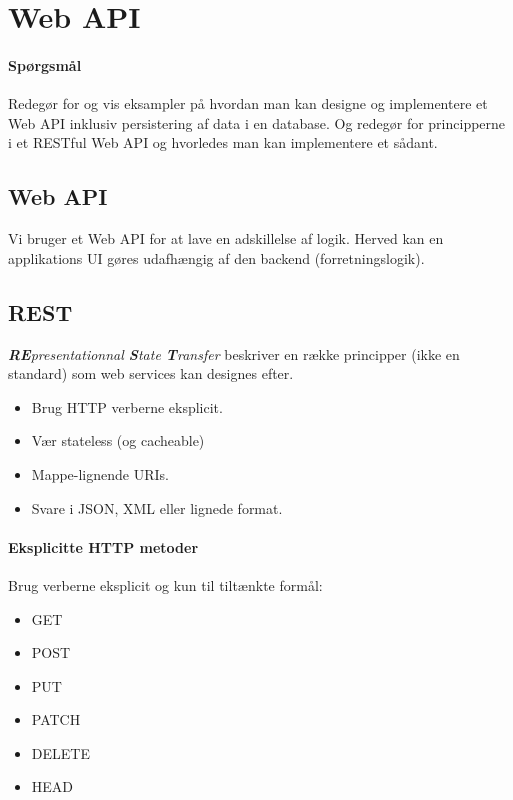 \section{Web API}

\paragraph{Spørgsmål}
Redegør for og vis eksampler på hvordan man kan designe	og implementere et Web API inklusiv persistering af data i en database.	Og redegør for principperne i et RESTful Web API og	hvorledes man kan implementere et sådant.

\subsection{Web API}
Vi bruger et Web API for at lave en adskillelse af logik. Herved kan en applikations UI gøres udafhængig af den backend (forretningslogik).

\subsection{REST}
\textit{\textbf{RE}presentationnal \textbf{S}tate \textbf{T}ransfer} beskriver en række principper (ikke en standard) som web services kan designes efter. 

\begin{itemize}
	\item Brug HTTP verberne eksplicit.
	\item Vær stateless (og cacheable)
	\item Mappe-lignende URIs.
	\item Svare i JSON, XML eller lignede format.
\end{itemize}

\paragraph{Eksplicitte HTTP metoder}
Brug verberne eksplicit og kun til tiltænkte formål: 

\begin{multicols}{2}
\begin{itemize}
	\item GET
	\item POST
	\item PUT
	\item PATCH
	\item DELETE
	\item HEAD
\end{itemize}
\end{multicols}

